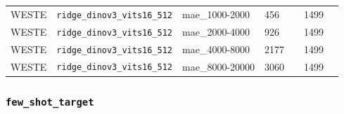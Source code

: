 \begin{center}
{\begin{tabular}{lp{2.4cm}llllp{7.3cm}}
WESTE & \texttt{ridge\_\allowbreak{}dinov3\_\allowbreak{}vits16\_\allowbreak{}512} & mae\_1000-2000 & 456 &  & 1499 &  \\
WESTE & \texttt{ridge\_\allowbreak{}dinov3\_\allowbreak{}vits16\_\allowbreak{}512} & mae\_2000-4000 & 926 &  & 1499 &  \\
WESTE & \texttt{ridge\_\allowbreak{}dinov3\_\allowbreak{}vits16\_\allowbreak{}512} & mae\_4000-8000 & 2177 &  & 1499 &  \\
WESTE & \texttt{ridge\_\allowbreak{}dinov3\_\allowbreak{}vits16\_\allowbreak{}512} & mae\_8000-20000 & 3060 &  & 1499 &  \\
\bottomrule
\end{tabular}}
\end{center}

\subsubsection{\texttt{few\_\allowbreak{}shot\_\allowbreak{}target}}

